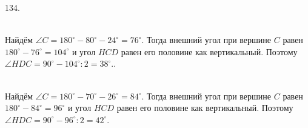 \documentclass[12pt]{article}
\begin{document}
134. \begin{figure}[ht!]
\end{figure}\\
Найдём $\angle C=180^\circ-80^\circ-24^\circ=76^\circ.$ Тогда внешний угол при вершине $C$ равен $180^\circ-76^\circ=104^\circ$ и угол $HCD$ равен его половине как вертикальный. Поэтому $\angle HDC=90^\circ-104^\circ:2=38^\circ.$\newpage{}. \begin{figure}[ht!]
\end{figure}\\
Найдём $\angle C=180^\circ-70^\circ-26^\circ=84^\circ.$ Тогда внешний угол при вершине $C$ равен $180^\circ-84^\circ=96^\circ$ и угол $HCD$ равен его половине как вертикальный. Поэтому $\angle HDC=90^\circ-96^\circ:2=42^\circ.$\\
\end{document}
